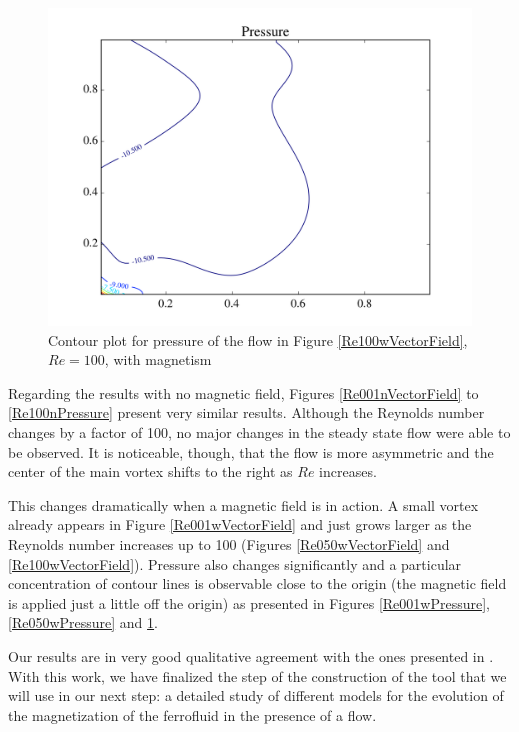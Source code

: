 \documentclass[journal]{IEEEtran}
\begin{document}
\begin{figure}[!t]
\centering
\includegraphics[width=\linewidth]{figures/Re100/w/pressure}
\caption{Contour plot for pressure of the flow in Figure \ref{Re100wVectorField}, $\mathit{Re}=100$, with magnetism \label{Re100wPressure}}
\end{figure}

Regarding the results with no magnetic field, Figures \ref{Re001nVectorField} to \ref{Re100nPressure} present very similar results. Although the Reynolds number changes by a factor of 100, no major changes in the steady state flow were able to be observed. It is noticeable, though, that the flow is more asymmetric and the center of the main vortex shifts to the right as $\mathit{Re}$ increases.

This changes dramatically when a magnetic field is in action. A small vortex already appears in Figure \ref{Re001wVectorField} and just grows larger as the Reynolds number increases up to 100 (Figures \ref{Re050wVectorField} and \ref{Re100wVectorField}). Pressure also changes significantly and a particular concentration of contour lines is observable close to the origin (the magnetic field is applied just a little off the origin) as presented in Figures \ref{Re001wPressure}, \ref{Re050wPressure} and \ref{Re100wPressure}.

Our results are in very good qualitative agreement with the ones presented in \cite{Tzirtzilakis2013}. With this work, we have finalized the step of the construction of the tool that we will use in our next step: a detailed study of different models for the evolution of the magnetization of the ferrofluid in the presence of a flow.
\end{document}
